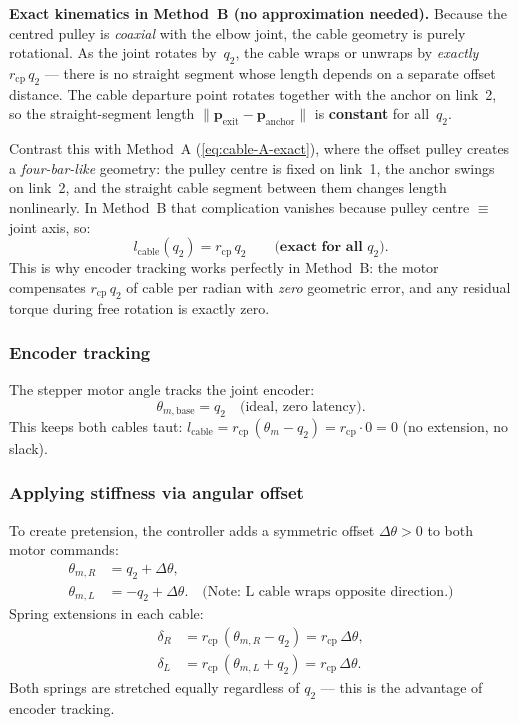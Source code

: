\documentclass[11pt, a4paper]{article}
\begin{document}
\begin{mdframed}
\textbf{Exact kinematics in Method~B (no approximation needed).}
Because the centred pulley is \emph{coaxial} with the elbow joint, the
cable geometry is purely rotational.  As the joint rotates by~$q_2$, the
cable wraps or unwraps by \emph{exactly} $r_{\text{cp}}\,q_2$ ---
there is no straight segment whose length depends on a separate offset
distance.  The cable departure point rotates together with the anchor on
link~2, so the straight-segment length $\lVert\bm{p}_{\text{exit}} -
\bm{p}_{\text{anchor}}\rVert$ is \textbf{constant} for all~$q_2$.

Contrast this with Method~A (\cref{eq:cable-A-exact}), where the offset
pulley creates a \emph{four-bar-like} geometry: the pulley centre is fixed
on link~1, the anchor swings on link~2, and the straight cable segment
between them changes length nonlinearly.  In Method~B that complication
vanishes because pulley centre $\equiv$ joint axis, so:
%
\begin{equation}\label{eq:exact-B}
    l_{\text{cable}}(q_2) = r_{\text{cp}}\,q_2
    \qquad\textbf{(exact for all }q_2\textbf{).}
\end{equation}
%
This is why encoder tracking works perfectly in Method~B: the motor
compensates $r_{\text{cp}}\,q_2$ of cable per radian with \emph{zero}
geometric error, and any residual torque during free rotation is exactly
zero.
\end{mdframed}

\subsubsection{Encoder tracking}

The stepper motor angle tracks the joint encoder:
%
\begin{equation}\label{eq:tracking}
    \theta_{m,\text{base}} = q_2 \quad\text{(ideal, zero latency)}.
\end{equation}
%
This keeps both cables taut:
$l_{\text{cable}} = r_{\text{cp}}\,(\theta_m - q_2)
= r_{\text{cp}} \cdot 0 = 0$ (no extension, no slack).

\subsubsection{Applying stiffness via angular offset}

To create pretension, the controller adds a symmetric offset
$\Delta\theta > 0$ to both motor commands:
%
\begin{align}
    \theta_{m,R} &= q_2 + \Delta\theta, \\
    \theta_{m,L} &= -q_2 + \Delta\theta.
    \quad\text{(Note: L cable wraps opposite direction.)}
\end{align}
%
Spring extensions in each cable:
%
\begin{align}\label{eq:delta_B}
    \delta_R &= r_{\text{cp}}\,(\theta_{m,R} - q_2)
             = r_{\text{cp}}\,\Delta\theta, \\
    \delta_L &= r_{\text{cp}}\,(\theta_{m,L} + q_2)
             = r_{\text{cp}}\,\Delta\theta.
\end{align}
%
Both springs are stretched equally regardless of $q_2$ --- this is the
advantage of encoder tracking.
\end{document}

